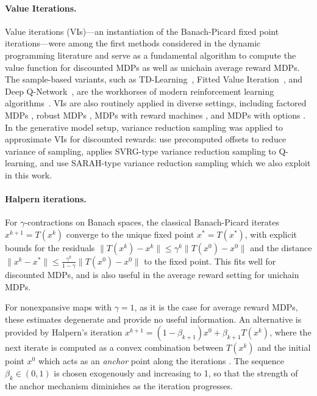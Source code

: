 \documentclass{article}
\theoremstyle{plain}
\theoremstyle{definition}
\theoremstyle{remark}
\begin{document}
\paragraph{Value Iterations.}
Value iterations (VIs)---an instantiation of the Banach-Picard fixed point iterations---were among the first methods considered in the dynamic programming literature \citep{bellman1957markovian} and serve as a fundamental algorithm to compute the value function for discounted MDPs as well as unichain average reward MDPs. The sample-based variants, such as TD-Learning~\citep{Sutton1988}, Fitted Value Iteration~\citep{Ernst05,Munos08JMLR}, and Deep Q-Network~\citep{MnihKavukcuogluSilveretal2015}, are the workhorses of modern reinforcement learning algorithms~\citep{Bertsekas96,sutton2018reinforcement,SzepesvariBook10}. VIs are also routinely applied in diverse settings, including factored MDPs \citep{rosenberg2021oracle}, robust MDPs \citep{kumarefficient}, MDPs with reward machines \citep{bourel2023exploration}, and MDPs with options \citep{fruit2017regret}. In the generative model setup, variance reduction sampling was applied to approximate VIs for discounted rewards: \citet{sidford2023variance, sidford2018near} use precomputed offsets to reduce variance of sampling, \citet{wainwright2019variance} applies SVRG-type variance reduction sampling \cite{johnson2013accelerating} to Q-learning, and \citet{jin2024truncated} use SARAH-type variance reduction sampling \citep{nguyen2017sarah} which we also exploit in this work.

\paragraph{Halpern iterations.}
For $\gamma$-contractions on Banach spaces,  the classical Banach-Picard iterates $x^{k+1}=T(x^{k})$ converge to the unique fixed point $x^*=T(x^*)$, with explicit bounds for the residuals $\|T(x^k)-x^k\|\leq \gamma^k\|T(x^0)-x^0\|$
and the distance 
$\|x^k-x^*\|\leq \frac{\gamma^k}{1-\gamma}\|T(x^0)-x^0\|$ to the fixed point. This fits well for discounted MDPs, and is also useful in the average reward setting for unichain MDPs. 

For nonexpansive maps with $\gamma=1$, as it is the  case for average reward MDPs, these estimates degenerate and provide no useful information. 
An alternative is provided by Halpern's iteration $x^{k+1}\!=\!(1-\beta_{k+1})x^0+\beta_{k+1} T(x^{k})$, where the next iterate is computed as a convex combination between $T(x^{k})$ and the initial point $x^0$ which acts as an {\em anchor} point along the iterations \citep{halpern1967fixed}. The sequence
$\beta_k\in (0,1)$ is chosen exogenously and increasing to 1, so that the strength of the anchor mechanism diminishes as the iteration progresses. 
\end{document}
